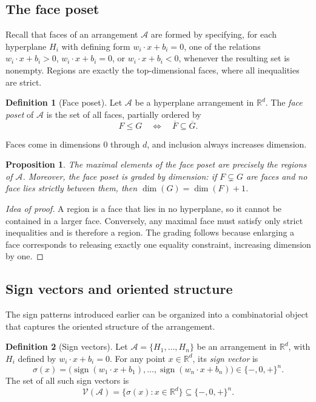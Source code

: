\documentclass[12pt]{amsart}
\theoremstyle{plain}
\newtheorem{proposition}{Proposition}[section]
\theoremstyle{definition}
\newtheorem{definition}{Definition}[section]
\theoremstyle{remark}
\newcommand{\R}{\mathbb{R}}
\newcommand{\A}{\mathcal{A}}
\newcommand{\V}{\mathcal{V}}
\begin{document}
\subsection{The face poset}
Recall that faces of an arrangement $\A$ are formed by specifying, for each hyperplane $H_i$ with defining form $w_i \cdot x + b_i = 0$, one of the relations $w_i \cdot x + b_i > 0$, $w_i \cdot x + b_i = 0$, or $w_i \cdot x + b_i < 0$, whenever the resulting set is nonempty. Regions are exactly the top-dimensional faces, where all inequalities are strict.

\begin{definition}[Face poset]
Let $\A$ be a hyperplane arrangement in $\R^d$.  
The \emph{face poset} of $\A$ is the set of all faces, partially ordered by
\[
F \le G \quad\Longleftrightarrow\quad \overline{F} \subseteq \overline{G}.
\]
\end{definition}

Faces come in dimensions $0$ through $d$, and inclusion always increases dimension.

\begin{proposition}
The maximal elements of the face poset are precisely the regions of $\A$. Moreover, the face poset is graded by dimension: if $F \subsetneq G$ are faces and no face lies strictly between them, then $\dim(G) = \dim(F) + 1$.
\end{proposition}

\begin{proof}[Idea of proof]
A region is a face that lies in no hyperplane, so it cannot be contained in a larger face. Conversely, any maximal face must satisfy only strict inequalities and is therefore a region. The grading follows because enlarging a face corresponds to releasing exactly one equality constraint, increasing dimension by one.
\end{proof}

\subsection{Sign vectors and oriented structure}
The sign patterns introduced earlier can be organized into a combinatorial object that captures the oriented structure of the arrangement.

\begin{definition}[Sign vectors]
Let $\A = \{H_1,\dots,H_n\}$ be an arrangement in $\R^d$, with $H_i$ defined by $w_i \cdot x + b_i = 0$. For any point $x \in \R^d$, its \emph{sign vector} is
\[
\sigma(x) = \bigl( \operatorname{sign}(w_1 \cdot x + b_1), \dots, \operatorname{sign}(w_n \cdot x + b_n) \bigr) \in \{-,0,+\}^n.
\]
The set of all such sign vectors is
\[
\V(\A) = \{ \sigma(x) : x \in \R^d \} \subseteq \{-,0,+\}^n.
\]
\end{definition}
\end{document}
